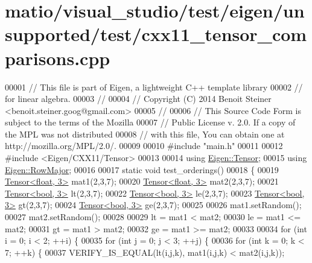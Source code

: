 \hypertarget{matio_2visual__studio_2test_2eigen_2unsupported_2test_2cxx11__tensor__comparisons_8cpp_source}{}\section{matio/visual\+\_\+studio/test/eigen/unsupported/test/cxx11\+\_\+tensor\+\_\+comparisons.cpp}
\label{matio_2visual__studio_2test_2eigen_2unsupported_2test_2cxx11__tensor__comparisons_8cpp_source}

\begin{DoxyCode}
00001 \textcolor{comment}{// This file is part of Eigen, a lightweight C++ template library}
00002 \textcolor{comment}{// for linear algebra.}
00003 \textcolor{comment}{//}
00004 \textcolor{comment}{// Copyright (C) 2014 Benoit Steiner <benoit.steiner.goog@gmail.com>}
00005 \textcolor{comment}{//}
00006 \textcolor{comment}{// This Source Code Form is subject to the terms of the Mozilla}
00007 \textcolor{comment}{// Public License v. 2.0. If a copy of the MPL was not distributed}
00008 \textcolor{comment}{// with this file, You can obtain one at http://mozilla.org/MPL/2.0/.}
00009 
00010 \textcolor{preprocessor}{#include "main.h"}
00011 
00012 \textcolor{preprocessor}{#include <Eigen/CXX11/Tensor>}
00013 
00014 \textcolor{keyword}{using} \hyperlink{class_eigen_1_1_tensor}{Eigen::Tensor};
00015 \textcolor{keyword}{using} \hyperlink{group__enums_ggaacded1a18ae58b0f554751f6cdf9eb13acfcde9cd8677c5f7caf6bd603666aae3}{Eigen::RowMajor};
00016 
00017 \textcolor{keyword}{static} \textcolor{keywordtype}{void} test\_orderings()
00018 \{
00019   \hyperlink{class_eigen_1_1_tensor}{Tensor<float, 3>} mat1(2,3,7);
00020   \hyperlink{class_eigen_1_1_tensor}{Tensor<float, 3>} mat2(2,3,7);
00021   \hyperlink{class_eigen_1_1_tensor}{Tensor<bool, 3>} lt(2,3,7);
00022   \hyperlink{class_eigen_1_1_tensor}{Tensor<bool, 3>} le(2,3,7);
00023   \hyperlink{class_eigen_1_1_tensor}{Tensor<bool, 3>} gt(2,3,7);
00024   \hyperlink{class_eigen_1_1_tensor}{Tensor<bool, 3>} ge(2,3,7);
00025 
00026   mat1.setRandom();
00027   mat2.setRandom();
00028 
00029   lt = mat1 < mat2;
00030   le = mat1 <= mat2;
00031   gt = mat1 > mat2;
00032   ge = mat1 >= mat2;
00033 
00034   \textcolor{keywordflow}{for} (\textcolor{keywordtype}{int} i = 0; i < 2; ++i) \{
00035     \textcolor{keywordflow}{for} (\textcolor{keywordtype}{int} j = 0; j < 3; ++j) \{
00036       \textcolor{keywordflow}{for} (\textcolor{keywordtype}{int} k = 0; k < 7; ++k) \{
00037         VERIFY\_IS\_EQUAL(lt(i,j,k), mat1(i,j,k) < mat2(i,j,k));

\end{DoxyCode}
